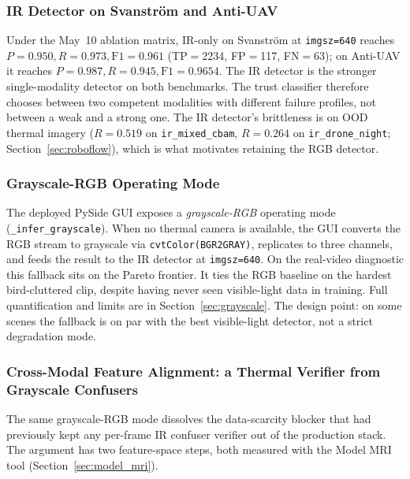 \subsubsection{IR Detector on Svanstr\"om and Anti-UAV}

Under the May~10 ablation matrix, IR-only on Svanstr\"om at \texttt{imgsz=640} reaches $P=0.950, R=0.973, \text{F1}=0.961$ (TP$=$2234, FP$=$117, FN$=$63); on Anti-UAV it reaches $P=0.987, R=0.945, \text{F1}=0.9654$. The IR detector is the stronger single-modality detector on both benchmarks. The trust classifier therefore chooses between two competent modalities with different failure profiles, not between a weak and a strong one. The IR detector's brittleness is on OOD thermal imagery ($R=0.519$ on \texttt{ir\_mixed\_cbam}, $R=0.264$ on \texttt{ir\_drone\_night}; Section~\ref{sec:roboflow}), which is what motivates retaining the RGB detector.

\subsubsection{Grayscale-RGB Operating Mode}
\label{sec:ir_grayscale_mode}

The deployed PySide GUI exposes a \emph{grayscale-RGB} operating mode (\texttt{\_infer\_grayscale}). When no thermal camera is available, the GUI converts the RGB stream to grayscale via \texttt{cvtColor(BGR2GRAY)}, replicates to three channels, and feeds the result to the IR detector at \texttt{imgsz=640}. On the real-video diagnostic this fallback sits on the Pareto frontier. It ties the RGB baseline on the hardest bird-cluttered clip, despite having never seen visible-light data in training. Full quantification and limits are in Section~\ref{sec:grayscale}. The design point: on some scenes the fallback is on par with the best visible-light detector, not a strict degradation mode.

\subsubsection{Cross-Modal Feature Alignment: a Thermal Verifier from Grayscale Confusers}
\label{sec:ir_xmodal_verifier}

The same grayscale-RGB mode dissolves the data-scarcity blocker that had previously kept any per-frame IR confuser verifier out of the production stack. The argument has two feature-space steps, both measured with the Model MRI tool (Section~\ref{sec:model_mri}).

